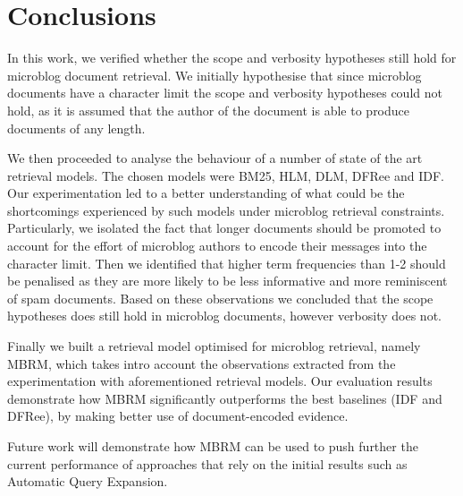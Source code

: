 \section{Conclusions}

\label{conclusion}

In this work, we verified whether the scope and verbosity hypotheses still hold for microblog document retrieval. We initially hypothesise that since microblog documents have a character limit the scope and verbosity hypotheses could not hold, as it is assumed that the author of the document is able to produce documents of any length. 

We then proceeded to analyse the behaviour of a number of state of the art retrieval models. The chosen models were BM25, HLM, DLM, DFRee and IDF. Our experimentation led to a better understanding of what could be the shortcomings experienced by such models under microblog retrieval constraints. Particularly, we isolated the fact that longer documents should be promoted to account for the effort of microblog authors to encode their messages into the character limit. Then we identified that higher term frequencies than 1-2 should be penalised as they are more likely to be less informative and more reminiscent of spam documents. Based on these observations we concluded that the scope hypotheses does still hold in microblog documents, however verbosity does not.

Finally we built a retrieval model optimised for microblog retrieval, namely MBRM, which takes intro account the observations extracted from the experimentation with aforementioned retrieval models. Our evaluation results demonstrate how MBRM significantly outperforms the best baselines (IDF and DFRee), by making better use of document-encoded evidence.

Future work will demonstrate how MBRM can be used to push further the current performance of approaches that rely on the initial results such as Automatic Query Expansion.